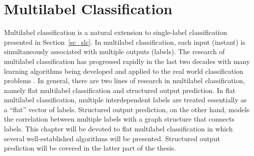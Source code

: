 {




%
%
\chapter{Multilabel Classification} \label{ch_fmlc}

Multilabel classification is a natural extension to single-label classification presented in Section~\ref{sc_slc}.
In multilabel classification, each input (instant) is simultaneously associated with multiple outputs (labels).
The research of multilabel classification has progressed rapidly in the last two decades with many learning algorithms being developed and applied to the real world classification problems \citep{lafferty01,taskar02,Taskar04max,THJA04,Rousu07}.
In general, there are two lines of research in multilabel classification, namely flat multilabel classification and structured output prediction.
In flat multilabel classification, multiple interdependent labels are treated essentially as a ``flat'' vector of labels.
Structured output prediction, on the other hand, models the correlation between multiple labels with a graph structure that connects labels.
This chapter will be devoted to flat multilabel classification in which several well-established algorithms will be presented.
Structured output prediction will be covered in the latter part of the thesis.

}
